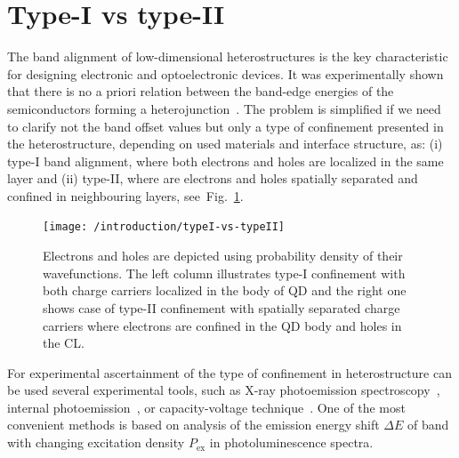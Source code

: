 \documentclass[
a4paper, %
11pt, %
onecolumn, %
openany, %
oldfontcommands,
]{memoir}
\begin{document}
\section{Type-I vs type-II}
The band alignment of low-dimensional heterostructures is the key characteristic for designing electronic and optoelectronic devices. It was experimentally shown that there is no a priori relation between the band-edge energies of the semiconductors forming a heterojunction~\cite{Kroemer1985}. The problem is simplified if we need to clarify not the band offset values but only a type of confinement presented in the heterostructure, depending on used materials and interface structure, as: (i) type-I band alignment, where both electrons and holes are localized in the same layer and (ii) type-II, where are electrons and holes spatially separated and confined in neighbouring layers, see~Fig.~\ref{fig:intr:typeI_vs_typeII}.
%
\begin{figure}
	\centering
	\texttt{[image: /introduction/typeI-vs-typeII]}
	\caption{Electrons and holes are depicted using probability density of their wavefunctions. The left column illustrates type-I confinement with both charge carriers localized in the body of QD and the right one shows case of type-II confinement with spatially separated charge carriers where electrons are confined in the QD body and holes in the CL.}
	\label{fig:intr:typeI_vs_typeII}
\end{figure}

For experimental ascertainment of the type of confinement in heterostructure can be used several experimental tools, such as X-ray photoemission spectroscopy~\cite{Lin2014}, internal photoemission~\cite{Zhang_2012}, or capacity-voltage technique~\cite{Brounkov_1996}. One of the most convenient methods is based on analysis of the emission energy shift $\Delta E$ of band with changing excitation density $P_\mathrm{ex}$ in photoluminescence spectra. %
\end{document}
